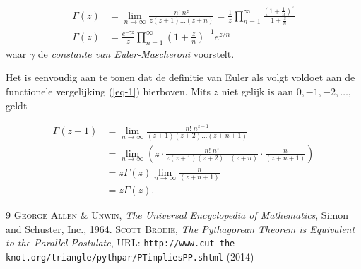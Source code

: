 \documentclass[11pt,a4paper]{amsart}
\begin{document}
\begin{align*}
\Gamma(z) &= 
\lim_{n \to \infty} \frac{n!\; n^z}{z (z+1)\dots(z+n)} 
= \frac{1}{z} \prod_{n=1}^\infty \frac{\left(1+\frac{1}{n}\right)^z}{1+\frac{z}{n}}
\\
\Gamma(z) &= 
\frac{e^{-\gamma z}}{z} \prod_{n=1}^\infty \left(1 + \frac{z}{n}\right)^{-1} e^{z/n}
\end{align*}
waar \(\gamma\) de \emph{constante van Euler-Mascheroni} voorstelt.

Het is eenvoudig aan te tonen dat de definitie van Euler als volgt voldoet aan de functionele vergelijking (\ref{eq-1}) hierboven. Mits \(z\) niet gelijk is aan 
\(0, -1, -2, \dots\), geldt

\begin{align*}
\Gamma(z+1) &= 
\lim_{n \to \infty} \frac{n!\; n^{z+1}}{(z+1) (z+2)\dots(z+n+1)} \\
&= \lim_{n \to \infty} \left( z \cdot \frac{n!\;  n^z}{z  (z+1)  (z+2)\dots(z+n)}   \cdot\frac{n}{(z+n+1)}\right) \\
&= z  \Gamma(z)  \lim_{n \to \infty} \frac{n}{(z+n+1)} \\
&= z  \Gamma(z).
\end{align*}


\begin{thebibliography}{9}
\textsc{George Allen \& Unwin}, \emph{The Universal Encyclopedia of Mathematics}, Simon and Schuster, Inc., 1964.
\textsc{Scott Brodie}, \emph{The Pythagorean Theorem is Equivalent to the 
Parallel Postulate}, URL:  
\texttt{http://www.cut-the-knot.org/triangle/pythpar/PTimpliesPP.shtml}
(2014)
\end{thebibliography}
\end{document}

